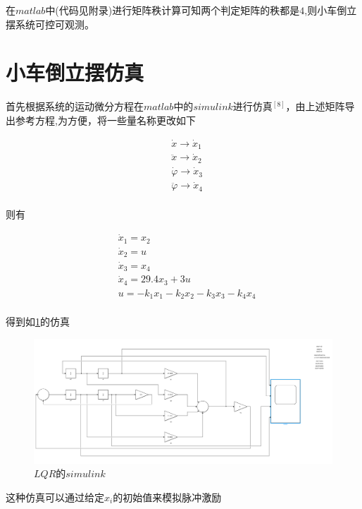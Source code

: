 在$matlab$中(代码见附录)进行矩阵秩计算可知两个判定矩阵的秩都是$4$,则小车倒立摆系统可控可观测。

\section{小车倒立摆仿真}

首先根据系统的运动微分方程在$matlab$中的$simulink$进行仿真$^{[8]}$，由上述矩阵导出参考方程,为方便，将一些量名称更改如下

\begin{equation}
\begin{aligned}
&\dot x\rightarrow \dot x_1\\
&\ddot x\rightarrow \dot x_2\\
&\dot \varphi \rightarrow \dot x_3\\
&\ddot \varphi \rightarrow \dot x_4\\
\end{aligned}
\end{equation}

则有

\begin{equation}
\begin{aligned}
&\dot x_1=x_2\\
&\dot x_2=u\\
&\dot x_3=x_4\\
&\dot x_4=29.4x_3+3u\\
&u=-k_1x_1-k_2x_2-k_3x_3-k_4x_4\\
\end{aligned}
\end{equation}

得到如\ref{LQR_simulink}的仿真

\begin{figure}[hbpt]
\centering
\includegraphics[width=16cm]{LQR_simulink.png}
\caption{$LQR的simulink$}\label{LQR_simulink}
\end{figure}

这种仿真可以通过给定$x_i$的初始值来模拟脉冲激励

